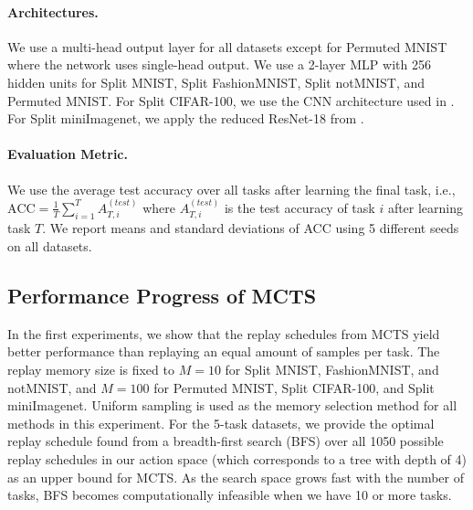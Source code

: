 %

\vspace{-3mm}
\paragraph{Architectures.} We use a multi-head output layer for all datasets except for Permuted MNIST where the network uses single-head output. We use a 2-layer MLP with 256 hidden units for Split MNIST, Split FashionMNIST, Split notMNIST, and Permuted MNIST. For Split CIFAR-100, we use the CNN architecture used in . For Split miniImagenet, we apply the reduced ResNet-18 from . 

\vspace{-3mm}
\paragraph{Evaluation Metric.} We use the average test accuracy over all tasks after learning the final task, i.e., $\text{ACC} = \frac{1}{T} \sum_{i=1}^{T} A_{T, i}^{(test)}$ where $A_{T, i}^{(test)}$ is the test accuracy of task $i$ after learning task $T$. We report means and standard deviations of ACC using 5 different seeds on all datasets. 



%
\subsection{Performance Progress of MCTS}\label{paperC:sec:results_with_mcts}

In the first experiments, we show that the replay schedules from MCTS yield better performance than replaying an equal amount of samples per task. 
The replay memory size is fixed to $M=10$ for Split MNIST, FashionMNIST, and notMNIST, and $M=100$ for Permuted MNIST, Split CIFAR-100, and Split miniImagenet. Uniform sampling is used as the memory selection method for all methods in this experiment.
For the 5-task datasets, we provide the optimal replay schedule found from a breadth-first search (BFS) over all 1050 possible replay schedules in our action space (which corresponds to a tree with depth of 4) as an upper bound for MCTS. As the search space grows fast with the number of tasks, BFS becomes computationally infeasible when we have 10 or more tasks.


